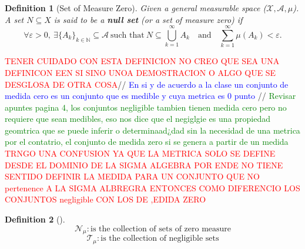 \documentclass[10pt, oneside]{article}
\newenvironment{definitionbox}[1][]{\begin{defbox}\begin{defn}[#1]}{\end{defn}\end{defbox}}
\numberwithin{equation}{section}
\newtheorem{defn}{Definition}[section]
\begin{document}
\begin{definitionbox}[Set of Measure Zero]\label{def:measure-zero}
Given a general measurable space ($\mathcal{X},\mathcal{A},\mu$). A set $N \subseteq X$ is said to be a \textbf{null set} (or a set of measure zero) if
\[
\forall \varepsilon > 0,\ \exists \{A_k\}_{k \in \mathbb{N}} \subseteq \mathcal{A}
\ \text{such that}\ 
N \subseteq \bigcup_{k=1}^{\infty} A_k 
\quad \text{and} \quad 
\sum_{k=1}^{\infty} \mu(A_k) < \varepsilon.
\]
\end{definitionbox}

\textcolor{red}{TENER CUIDADO CON ESTA DEFINICION NO CREO QUE SEA UNA DEFINICON EEN SI SINO UNOA DEMOSTRACION O ALGO QUE SE DESGLOSA DE OTRA COSA}//
\textcolor{blue}{En si y de acuerdo a la clase un conjunto de medida cero es un conjunto que es medible y cuya metrica es 0 punto} //
\textcolor{green}{Revisar apuntes pagina 4, los conjuntos negligible tambien tienen medida cero pero no requiere que sean medibles, eso nos dice que el negiglgie es una propiedad geomtrica que se puede
inferir o determinaad¿dad sin la necesidad de una metrica por el contatrio, el conjunto de medida zero si se genera a partir de un medida}
\textcolor{red}{TRNGO UNA CONFUSION YA QUE LA METRICA SOLO SE DEFINE DESDE EL DOMINIO DE LA SIGMA ALGEBRA POR ENDE
NO TIENE SENTIDO DEFINIR LA MEDIDA PARA UN CONJUNTO QUE NO pertenence A LA SIGMA ALBREGRA ENTONCES COMO DIFERENCIO LOS CONJUNTOS negligible CON LOS DE ,EDIDA ZERO}
\begin{definitionbox}
    \[\mathcal{N}_\mu : \text{is the collection of sets of zero measure}
    \]
    \[\mathcal{T}_\mu : \text{is the collection of negligible sets}
    \]
\end{definitionbox}
\end{document}
